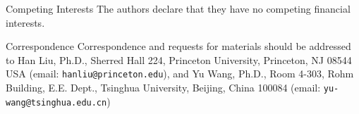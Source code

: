 \documentclass{nature}
\begin{document}





\begin{addendum}
 \item[Competing Interests] The authors declare that they have no
competing financial interests.
 \item[Correspondence] Correspondence and requests for materials should be
addressed to Han Liu, Ph.D., Sherred Hall 224, Princeton University, Princeton,
NJ 08544 USA (email: \texttt{hanliu@princeton.edu}), and Yu Wang, Ph.D., Room
4-303, Rohm Building, E.E. Dept., Tsinghua University, Beijing, China 100084
(email: \texttt{yu-wang@tsinghua.edu.cn})
\end{addendum}

	
\end{document}
